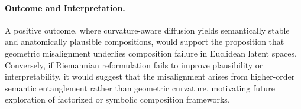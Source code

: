 





\paragraph{Outcome and Interpretation.}
A positive outcome, where curvature-aware diffusion yields semantically stable and anatomically plausible compositions, would support the proposition that geometric misalignment underlies composition failure in Euclidean latent spaces.  
Conversely, if Riemannian reformulation fails to improve plausibility or interpretability, it would suggest that the misalignment arises from higher-order semantic entanglement rather than geometric curvature, motivating future exploration of factorized or symbolic composition frameworks.


